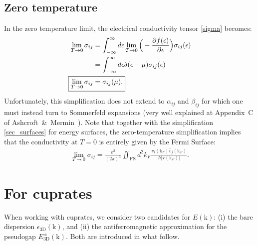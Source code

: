 \documentclass[notitlepage,11pt,nofootinbib]{revtex4-1}
\renewcommand{\vec}[1]{\bm{\mathrm{#1}}}
\begin{document}
\subsection{Zero temperature}
In the zero temperature limit, the electrical conductivity tensor \eqref{sigma} becomes: 
\begin{align}
\lim_{T\rightarrow 0}\sigma_{ij}
&=
\int_{-\infty}^{\infty} d\epsilon
\lim_{T\rightarrow 0}\Big(-\frac{\partial f(\epsilon)}{\partial\epsilon}\Big) \sigma_{ij}(\epsilon)
\\
&=
\int_{-\infty}^{\infty} d\epsilon
\delta(\epsilon-\mu) \sigma_{ij}(\epsilon)
\\
\Aboxed{
\lim_{T\rightarrow 0}\sigma_{ij}&=\sigma_{ij}(\mu).
}
\end{align}
Unfortunately, this simplification does not extend to $\alpha_{ij}$ and $\beta_{ij}$ for which one must instead turn to Sommerfeld expansions (very well explained at Appendix~C of Ashcroft~\&~Mermin~\cite{ashcroft_solid_1976}).
Note that together with the simplification \ref{sec_surfaces} for energy surfaces, the zero-temperature simplification implies that the conductivity at $T=0$ is entirely given by the Fermi Surface:
\begin{align}
\lim_{T\rightarrow0}\sigma_{ij} 
=\frac{e^2}{(2\pi)^3}\iint_{\text{FS}}d^2k_F
\frac{v_{i}(\vec k_F)\bar{v}_{j}(\vec k_F)}{\hbar|\vec v(\vec k_F)|}.
\label{zeroTemperature}
\end{align}



\section{For cuprates}\label{section_disp}
\noindent
When working with cuprates, we consider two candidates for $E(\vec k)$: (i) the bare dispersion $\epsilon_{\text{3D}}(\vec k)$, and (ii) the antiferromagnetic approximation for the pseudogap $E^{\pm}_{\text{3D}}(\vec k)$. Both are introduced in what follow.
\end{document}
